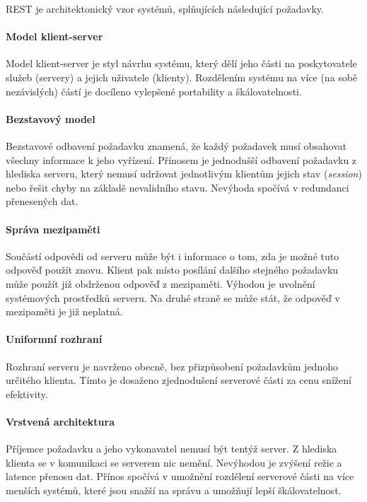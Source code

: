 REST \cite{rest} je architektonický vzor systémů, splňujících následující požadavky.

\paragraph{Model klient-server}

Model klient-server je styl návrhu systému, který dělí jeho části na poskytovatele služeb (servery) a jejich uživatele (klienty).
Rozdělením systému na více (na sobě nezávislých) částí je docíleno vylepšené portability a škálovatelnosti.

\paragraph{Bezstavový model}

Bezstavové odbavení požadavku znamená, že každý požadavek musí obsahovat všechny informace k jeho vyřízení.
Přínosem je jednodušší odbavení požadavku z hlediska serveru, který nemusí udržovat jednotlivým klientům jejich stav (\textit{session}) nebo řešit chyby na základě nevalidního stavu.
Nevýhoda spočívá v redundanci přenesených dat.

\paragraph{Správa mezipaměti}

Součástí odpovědi od serveru může být i informace o tom, zda je možné tuto odpověď použít znovu.
Klient pak místo posílání dalšího stejného požadavku může použít již obdrženou odpověď z mezipaměti.
Výhodou je uvolnění systémových prostředků serveru.
Na druhé straně se může stát, že odpověď v mezipaměti je již neplatná.

\paragraph{Uniformní rozhraní}

Rozhraní serveru je navrženo obecně, bez přizpůsobení požadavkům jednoho určitého klienta.
Tímto je dosaženo zjednodušení serverové části za cenu snížení efektivity.

\paragraph{Vrstvená architektura}

Příjemce požadavku a jeho vykonavatel nemusí být tentýž server.
Z hlediska klienta se v komunikaci se serverem nic nemění.
Nevýhodou je zvýšení režie a latence přenosu dat.
Přínos spočívá v umožnění rozdělení serverové části na více menších systémů, které jsou snažší na správu a umožňují lepší škálovatelnost.

